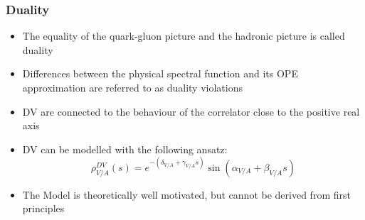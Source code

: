 \documentclass{beamer}
\begin{document}
\begin{frame}
  \frametitle{Duality}
  \begin{itemize}
  \item The equality of the quark-gluon picture and the hadronic picture is
    called duality
  \item Differences between the physical spectral function and its OPE
    approximation are referred to as duality violations
  \item DV are connected to the behaviour of the correlator close to the
    positive real axis
    
  \vfill

  \item DV can be modelled with the following ansatz:
    \begin{equation}
      \rho_{V/A}^{DV}(s) = e^{-(\delta_{V/A} + \gamma_{V/A}s)} \sin(\alpha_{V/A} + \beta_{V/A}s)
    \end{equation}
    \begin{scriptsize}
      \cite{Boito2011a}
    \end{scriptsize}
  \item The Model is theoretically well motivated, but cannot be derived from
    first principles
  \end{itemize}
\end{frame}
\end{document}
